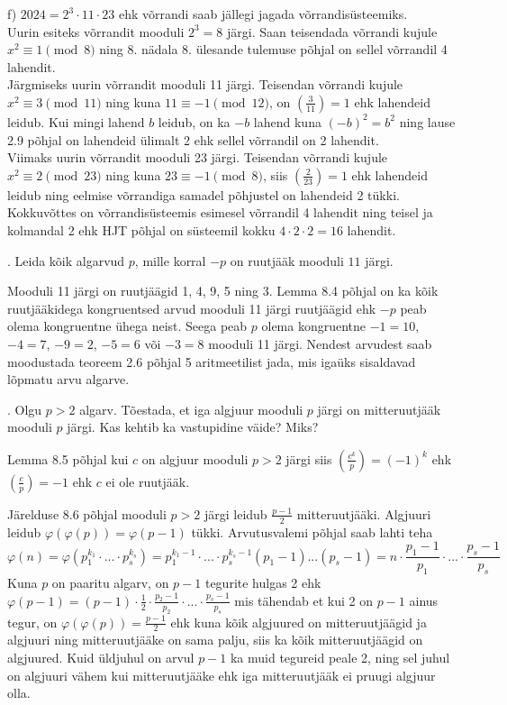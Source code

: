 \documentclass[a4paper, 10pt]{article}
\newcommand{\leg}[2]{\left(\frac{#1}{#2}\right)}
\begin{document}
f) $2024=2^3\cdot11\cdot23$ ehk võrrandi saab jällegi jagada võrrandisüsteemiks.\\
Uurin esiteks võrrandit mooduli $2^3=8$ järgi. Saan teisendada võrrandi kujule $x^2\equiv1\pmod8$ ning 8. nädala 8. ülesande tulemuse põhjal on sellel võrrandil 4 lahendit.\\
Järgmiseks uurin võrrandit mooduli 11 järgi. Teisendan võrrandi kujule $x^2\equiv3\pmod{11}$ ning kuna $11\equiv-1\pmod{12}$, on $\leg 3{11}=1$ ehk lahendeid leidub. Kui mingi lahend $b$ leidub, on ka $-b$ lahend kuna $(-b)^2=b^2$ ning lause 2.9 põhjal on lahendeid ülimalt 2 ehk sellel võrrandil on 2 lahendit.\\
Viimaks uurin võrrandit mooduli 23 järgi. Teisendan võrrandi kujule $x^2\equiv2\pmod{23}$ ning kuna \mbox{$23\equiv-1\pmod8$}, siis $\leg {2}{23}=1$ ehk lahendeid leidub ning eelmise võrrandiga samadel põhjustel on lahendeid 2 tükki.\\
Kokkuvõttes on võrrandisüsteemis esimesel võrrandil 4 lahendit ning teisel ja kolmandal 2 ehk HJT põhjal on süsteemil kokku $4\cdot2\cdot2=16$ lahendit.

\bigskip

. Leida kõik algarvud $p$, mille korral $-p$ on ruutjääk mooduli $11$ järgi. 

\bigskip
Mooduli 11 järgi on ruutjäägid 1, 4, 9, 5 ning 3. Lemma 8.4 põhjal on ka kõik ruutjääkidega kongruentsed arvud mooduli 11 järgi ruutjäägid ehk $-p$ peab olema kongruentne ühega neist. Seega peab $p$ olema kongruentne $-1=10$, $-4=7$, $-9=2$, $-5=6$ või $-3=8$ mooduli 11 järgi. Nendest arvudest saab moodustada teoreem 2.6 põhjal 5 aritmeetilist jada, mis igaüks sisaldavad lõpmatu arvu algarve. 

\bigskip

\pagebreak

. Olgu $p>2$ algarv. Tõestada, et iga algjuur mooduli $p$ järgi on mitteruutjääk mooduli $p$ järgi. Kas kehtib ka vastupidine väide? Miks?

\bigskip
Lemma 8.5 põhjal kui $c$ on algjuur mooduli $p>2$ järgi siis $\leg {c^k}p=(-1)^k$ ehk $\leg cp=-1$ ehk $c$ ei ole ruutjääk.

Järelduse 8.6 põhjal mooduli $p>2$ järgi leidub $\frac {p-1}2$ mitteruutjääki. Algjuuri leidub $\varphi(\varphi(p))=\varphi(p-1)$ tükki. Arvutusvalemi põhjal saab lahti teha $$\varphi(n)=\varphi(p_1^{k_1}\cdot...\cdot p_s^{k_s})=p_1^{k_1-1}\cdot...\cdot p_s^{k_s-1}(p_1-1)...(p_s-1)=n\cdot\frac{p_1-1}{p_1}\cdot...\cdot\frac{p_s-1}{p_s}$$
Kuna $p$ on paaritu algarv, on $p-1$ tegurite hulgas 2 ehk $\varphi(p-1)=(p-1)\cdot\frac12\cdot\frac{p_2-1}{p_2}\cdot...\cdot\frac{p_s-1}{p_s}$ mis tähendab et kui 2 on $p-1$ ainus tegur, on $\varphi(\varphi(p))=\frac{p-1}2$ ehk kuna kõik algjuured on mitteruutjäägid ja algjuuri ning mitteruutjääke on sama palju, siis ka kõik mitteruutjäägid on algjuured. Kuid üldjuhul on arvul $p-1$ ka muid tegureid peale 2, ning sel juhul on algjuuri vähem kui mitteruutjääke ehk iga mitteruutjääk ei pruugi algjuur olla.
\bigskip
\end{document}
